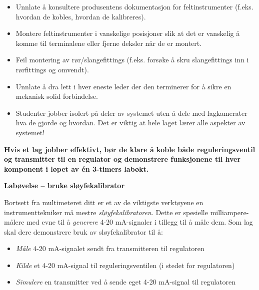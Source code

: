\begin{itemize}
\item{} Unnlate å konsultere produsentens dokumentasjon for feltinstrumenter (f.eks. hvordan de kobles, hvordan de kalibreres).
\item{} Montere feltinstrumenter i vanskelige posisjoner slik at det er vanskelig å komme til terminalene eller fjerne deksler når de er montert.
\item{} Feil montering av rør/slangefittings (f.eks. forsøke å skru slangefittings inn i rørfittings og omvendt).
\item{} Unnlate å dra lett i hver eneste leder der den terminerer for å sikre en mekanisk solid forbindelse.
\item{} Studenter jobber isolert på deler av systemet uten å dele med lagkamerater hva de gjorde og hvordan.  Det er viktig at hele laget lærer alle aspekter av systemet!
\end{itemize}

\vskip 10pt

{\bf Hvis et lag jobber effektivt, bør de klare å koble både reguleringsventil og transmitter til en regulator og demonstrere funksjonene til hver komponent i løpet av én 3-timers labøkt.}








\vfil \eject

\noindent
{\bf Labøvelse -- bruke sløyfekalibrator}

\vskip 5pt

Bortsett fra multimeteret ditt er et av de viktigste verktøyene en instrumenttekniker må mestre {\it sløyfekalibratoren}.  Dette er spesielle milliampere-målere med evne til å {\it generere} 4-20 mA-signaler i tillegg til å måle dem.  Som lag skal dere demonstrere bruk av sløyfekalibrator til å:

\vskip 10pt

\begin{itemize}
\item{} {\it Måle} 4-20 mA-signalet sendt fra transmitteren til regulatoren
\vskip 15pt 
\item{} {\it Kilde} et 4-20 mA-signal til reguleringsventilen (i stedet for regulatoren)
\vskip 15pt 
\item{} {\it Simulere} en transmitter ved å sende eget 4-20 mA-signal til regulatoren
\end{itemize}

\vskip 10pt

